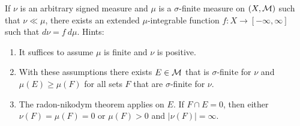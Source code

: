 \documentclass[12pt,a4paper]{article}
\begin{document}
\begin{problem}\label{prob:3-14}
If $\nu$ is an arbitrary signed measure and $\mu$ is a $\sigma$-finite measure on $(X, \mathcal{M})$ such that $\nu\ll\mu$, there exists an extended $\mu$-integrable function $f:X\rightarrow[-\infty,\infty]$ such that $d\nu=f~d\mu$. Hints:
\begin{enumerate}[label=\alph*.]
	\item It suffices to assume $\mu$ is finite and $\nu$ is positive.
	\item With these assumptions there exists $E\in\mathcal{M}$ that is $\sigma$-finite for $\nu$ and $\mu(E)\geq\mu(F)$ for all sets $F$ that are $\sigma$-finite for $\nu$.
	\item The radon-nikodym theorem applies on $E$. If $F\cap E=0$, then either $\nu(F)=\mu(F)=0$ or $\mu(F)>0$ and $|\nu(F)|=\infty$.
\end{enumerate}
\end{problem}
\end{document}
